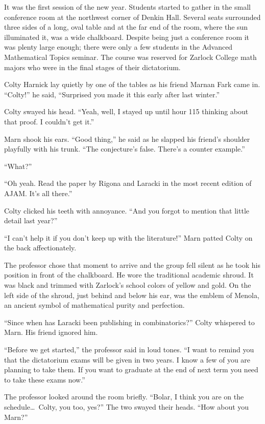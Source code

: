 

It was the first session of the new year. Students started to gather in the small conference
room at the northwest corner of Denkin Hall. Several seats surrounded three sides of a long, oval
table and at the far end of the room, where the sun illuminated it, was a wide chalkboard.
Despite being just a conference room it was plenty large enough; there were only a few students
in the Advanced Mathematical Topics seminar. The course was reserved for Zarlock College math
majors who were in the final stages of their dictatorium.

Colty Harnick lay quietly by one of the tables as his friend Marnan Fark came in. ``Colty!'' he
said, ``Surprised you made it this early after last winter.''

Colty swayed his head. ``Yeah, well, I stayed up until hour 115 thinking about that proof. I
couldn't get it.''

Marn shook his ears. ``Good thing,'' he said as he slapped his friend's shoulder playfully with
his trunk. ``The conjecture's false. There's a counter example.''

``What?''

``Oh yeah. Read the paper by Rigona and Laracki in the most recent edition of AJAM. It's all
there.''

Colty clicked his teeth with annoyance. ``And you forgot to mention that little detail last
year?''

``I can't help it if you don't keep up with the literature!'' Marn patted Colty on the back
affectionately.

The professor chose that moment to arrive and the group fell silent as he took his position in
front of the chalkboard. He wore the traditional academic shroud. It was black and trimmed with
Zarlock's school colors of yellow and gold. On the left side of the shroud, just behind and
below his ear, was the emblem of Menola, an ancient symbol of mathematical purity and
perfection.

``Since when has Laracki been publishing in combinatorics?'' Colty whispered to Marn. His friend
ignored him.

``Before we get started,'' the professor said in loud tones. ``I want to remind you that the
dictatorium exams will be given in two years. I know a few of you are planning to take them. If
you want to graduate at the end of next term you need to take these exams now.''

The professor looked around the room briefly. ``Bolar, I think you are on the schedule\ldots\
Colty, you too, yes?'' The two swayed their heads. ``How about you Marn?''

